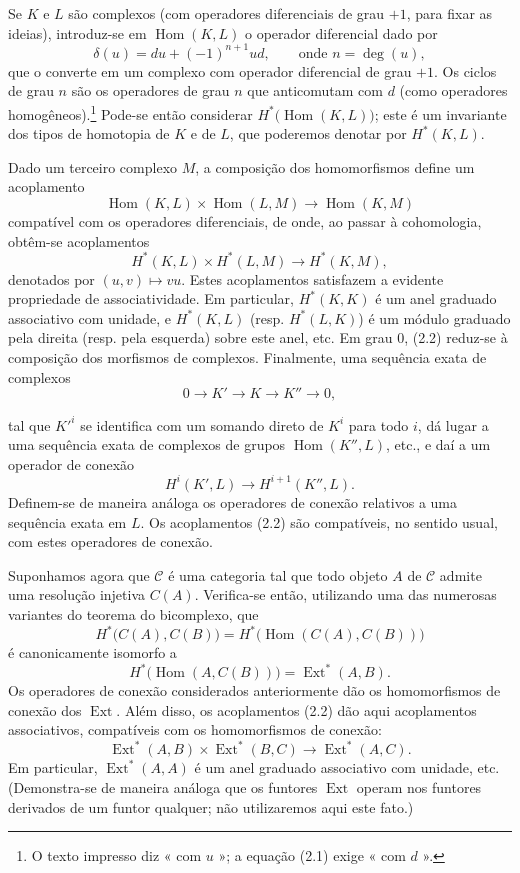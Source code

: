 \documentclass[11pt,twoside,openany]{book}
\numberwithin{equation}{section}
\newcommand{\src}[1]{%
  \phantomsection\hypertarget{src:#1}{}%
  \marginpar{\raggedleft\footnotesize\sffamily #1}%
}
\newcommand{\Ccat}{\mathcal C}
\theoremstyle{plain}
\theoremstyle{definition}
\theoremstyle{remark}
\newcommand{\FgaUnitKey}{frontmatter}
\renewcommand{\src}[1]{%
  \phantomsection\hypertarget{src:\FgaUnitKey:#1}{}%
  \marginpar{\raggedleft\footnotesize\sffamily #1}%
}
\begin{document}
Se $K$ e $L$ são complexos (com operadores diferenciais de grau $+1$, para
fixar as ideias), introduz-se em $\operatorname{Hom}(K,L)$ o operador
diferencial dado por
\begin{equation}\tag{2.1}
  \delta(u)=du+(-1)^{n+1}ud,\qquad\text{onde }n=\deg(u),
\end{equation}
que o converte em um complexo com operador diferencial de grau $+1$. Os ciclos de
grau $n$ são os operadores de grau $n$ que anticomutam com $d$ (como
operadores homogêneos).\footnote{O texto impresso diz « com $u$ »; a equação
(2.1) exige « com $d$ ».} Pode-se então considerar
$H^{*}\bigl(\operatorname{Hom}(K,L)\bigr)$; este é um invariante dos tipos
de homotopia de $K$ e de $L$, que poderemos denotar por $H^{*}(K,L)$.

Dado um terceiro complexo $M$, a composição dos homomorfismos
define um acoplamento
\[
  \operatorname{Hom}(K,L)\times\operatorname{Hom}(L,M)
  \longrightarrow\operatorname{Hom}(K,M)
\]
compatível com os operadores diferenciais, de onde, ao passar à cohomologia,
obtêm-se acoplamentos
\begin{equation}\tag{2.2}
  H^{*}(K,L)\times H^{*}(L,M)\longrightarrow H^{*}(K,M),
\end{equation}
denotados por $(u,v)\longmapsto vu$. Estes acoplamentos satisfazem a evidente propriedade
de associatividade. Em particular, $H^{*}(K,K)$ é um anel graduado associativo
com unidade, e $H^{*}(K,L)$ (resp. $H^{*}(L,K)$) é um módulo graduado pela direita
(resp. pela esquerda) sobre este anel, etc. Em grau $0$, (2.2) reduz-se à
composição dos morfismos de complexos. Finalmente, uma sequência exata de
complexos
\[
  0\longrightarrow K'\longrightarrow K\longrightarrow K''\longrightarrow 0,
\]
\src{172}
tal que $K'^{i}$ se identifica com um somando direto de $K^{i}$ para todo $i$,
dá lugar a uma sequência exata de complexos de grupos
$\operatorname{Hom}(K'',L)$, etc., e daí a um operador de conexão
\[
  H^{i}(K',L)\longrightarrow H^{i+1}(K'',L).
\]
Definem-se de maneira análoga os operadores de conexão relativos a uma sequência exata em $L$. Os
acoplamentos (2.2) são compatíveis, no sentido usual, com estes operadores de conexão.

Suponhamos agora que $\Ccat$ é uma categoria tal que todo objeto $A$
de $\Ccat$ admite uma resolução injetiva $C(A)$. Verifica-se então, utilizando
uma das numerosas variantes do teorema do bicomplexo, que
\[
  H^{*}\bigl(C(A),C(B)\bigr)
  =H^{*}\bigl(\operatorname{Hom}(C(A),C(B))\bigr)
\]
é canonicamente isomorfo a
\[
  H^{*}\bigl(\operatorname{Hom}(A,C(B))\bigr)
  =\operatorname{Ext}^{*}(A,B).
\]
Os operadores de conexão considerados anteriormente dão os homomorfismos de conexão dos
$\operatorname{Ext}$. Além disso, os acoplamentos (2.2) dão aqui
acoplamentos associativos, compatíveis com os homomorfismos de conexão:
\begin{equation}\tag{2.3}
  \operatorname{Ext}^{*}(A,B)\times\operatorname{Ext}^{*}(B,C)
  \longrightarrow\operatorname{Ext}^{*}(A,C).
\end{equation}
Em particular, $\operatorname{Ext}^{*}(A,A)$ é um anel graduado associativo
com unidade, etc. (Demonstra-se de maneira análoga que os funtores
$\operatorname{Ext}$ operam nos funtores derivados de um funtor
qualquer; não utilizaremos aqui este fato.)
\end{document}
